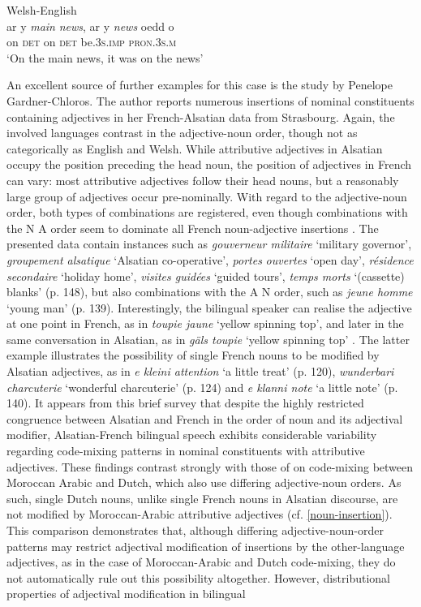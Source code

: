 \ea{\label{ex:4:7}}
Welsh-English \citep[261]{deuchar-congruence-2005}\\
\gll ar y \textit{main} \textit{news}, ar y \textit{news} oedd o\\
	on \textsc{det} {} {} on \textsc{det} {} be.\textsc{3s.imp} \textsc{pron.3s.m}\\
\glt `On the main news, it was on the news'
\glend
\z

An excellent source of further examples for this case is the \citeyear{gardner-chloros-1991} study by Penelope Gardner-Chloros. The author reports numerous insertions of nominal constituents containing adjectives in her French-Alsatian data from Strasbourg. Again, the involved languages contrast in the adjective-noun order, though not as categorically as English and Welsh. While attributive adjectives in Alsatian occupy the position preceding the head noun, the position of adjectives in French can vary: most attributive adjectives follow their head nouns, but a reasonably large group of adjectives occur pre-nominally. With regard to the adjective-noun order, both types of combinations are registered, even though combinations with the N A order seem to dominate all French noun-adjective insertions  \citep[cf.][141]{gardner-chloros-1991}. The presented data contain instances such as \textit{gouverneur militaire} `military governor', \textit{groupement alsatique} `Alsatian co-operative', \textit{portes} \textit{ouvertes} `open day', \textit{résidence secondaire} `holiday home', \textit{visites guidées} `guided tours', \textit{temps morts} `(cassette) blanks' (p. 148), but also combinations with the A N order, such as \textit{jeune homme} `young man' (p. 139). Interestingly, the bilingual speaker can realise the adjective at one point in French, as in \textit{toupie jaune} `yellow spinning top', and later in the same conversation in Alsatian, as in \textit{gäls toupie} `yellow spinning top' \citep[133]{gardner-chloros-1991}. The latter example illustrates the possibility of single French nouns to be modified by Alsatian adjectives, as in \textit{e kleini attention} `a little treat' (p. 120), \textit{wunderbari charcuterie} `wonderful charcuterie' (p. 124) and  \textit{e klanni note} `a little note' (p. 140). It appears from this brief survey that despite the highly restricted congruence between Alsatian and French in the order of noun and its adjectival modifier, Alsatian-French bilingual speech exhibits considerable variability regarding code-mixing patterns in nominal constituents with attributive adjectives. These findings contrast strongly with those of \citet{boumans-syntax-1998} on code-mixing between Moroccan Arabic and Dutch, which also use differing adjective-noun orders. As such, single Dutch nouns, unlike single French nouns in Alsatian discourse, are not modified by Moroccan-Arabic attributive adjectives (cf. \ref{noun-insertion}). This comparison demonstrates that, although differing adjective-noun-order patterns may restrict adjectival modification of insertions by the other-language adjectives, as in the case of Moroccan-Arabic and Dutch code-mixing, they do not automatically rule out this possibility altogether. However, distributional properties of adjectival modification in bilingual 